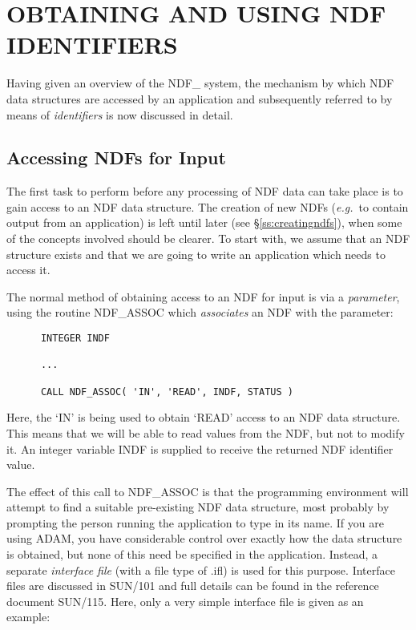 \documentclass[twoside,11pt]{article}
\newcommand{\htmlref}[2]{#1}
\newcommand{\xref}[3]{#1}
\newcommand{\xlabel}[1]{}
\newcommand{\st}[1]{{\em{#1}}}
\begin{document}
\section{\xlabel{obtaining_and_using_ndf_identifiers}OBTAINING AND USING NDF IDENTIFIERS}

Having given an overview of the NDF\_ system, the mechanism by which NDF data
structures are accessed by an application and subsequently referred to by means
of \st{identifiers\/} is now discussed in detail. 

\subsection{\xlabel{accessing_ndfs_for_input}\label{ss:associnput}Accessing NDFs for Input}

The first task to perform before any processing of NDF data can take place is
to gain access to an NDF data structure.
The creation of new NDFs (\st{e.g.}\ to contain output from an application)
is left until later (see \S\ref{ss:creatingndfs}), when some of the concepts
involved should be clearer. 
To start with, we assume that an NDF structure exists and that we are  going to
write an application which needs to access it.

The normal method of obtaining access to an NDF for input is via a
\st{parameter}, using the routine \htmlref{NDF\_ASSOC}{NDF_ASSOC} which \st{associates\/}
an NDF with the parameter:

\small
\begin{verbatim}
      INTEGER INDF

      ...

      CALL NDF_ASSOC( 'IN', 'READ', INDF, STATUS )
\end{verbatim}
\normalsize

Here, the `IN' is being used to obtain `READ' access to an NDF data structure.
This means that we will be able to read values from the NDF, but not to
modify it.
An integer variable INDF is supplied to receive the returned NDF identifier 
value.

The effect of this call to NDF\_ASSOC is that the programming
environment will attempt to find a suitable pre-existing NDF data
structure, most probably by prompting the person running the
application to type in its name.
If you are using \xref{ADAM}{sg4}{}, you have considerable control over exactly how
the data structure is obtained, but none of this need be specified in
the application.
Instead, a separate \st{interface file\/} (with a file type of .ifl) is used
for this purpose.
Interface files are discussed in \xref{SUN/101}{sun101}{} and full
details can be found in the reference document \xref{SUN/115}{sun115}{}.
Here, only a very simple interface file is given as an example:
\end{document}
